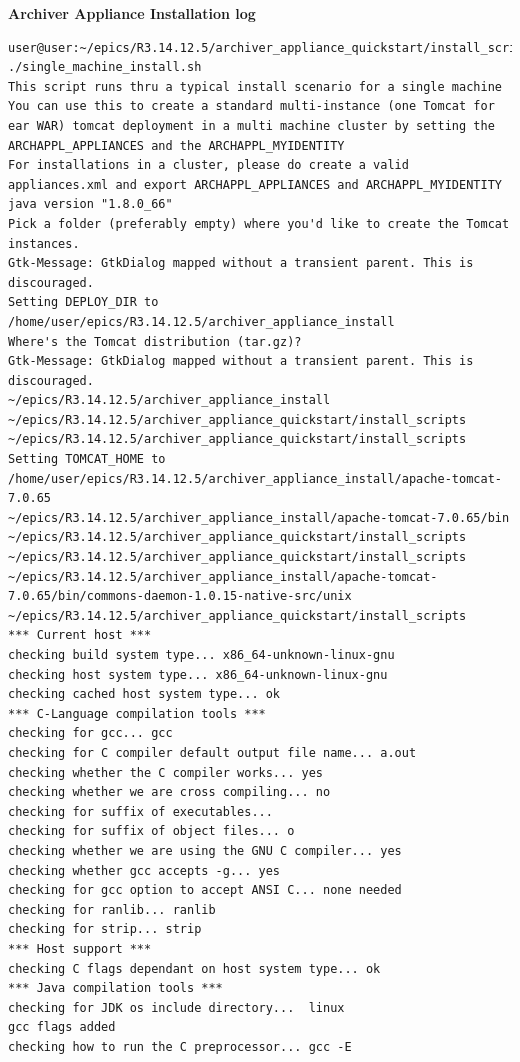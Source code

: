\documentclass[11pt
  , a4paper
  , article
  , oneside
]{memoir}
\begin{document}
\begin{center}
	\LARGE\textbf{Archiver Appliance Installation log}
\end{center}
\begin{lstlisting}[style=termstyle]
user@user:~/epics/R3.14.12.5/archiver_appliance_quickstart/install_scripts$ ./single_machine_install.sh 
This script runs thru a typical install scenario for a single machine
You can use this to create a standard multi-instance (one Tomcat for ear WAR) tomcat deployment in a multi machine cluster by setting the ARCHAPPL_APPLIANCES and the ARCHAPPL_MYIDENTITY
For installations in a cluster, please do create a valid appliances.xml and export ARCHAPPL_APPLIANCES and ARCHAPPL_MYIDENTITY
java version "1.8.0_66"
Pick a folder (preferably empty) where you'd like to create the Tomcat instances.
Gtk-Message: GtkDialog mapped without a transient parent. This is discouraged.
Setting DEPLOY_DIR to /home/user/epics/R3.14.12.5/archiver_appliance_install
Where's the Tomcat distribution (tar.gz)?
Gtk-Message: GtkDialog mapped without a transient parent. This is discouraged.
~/epics/R3.14.12.5/archiver_appliance_install ~/epics/R3.14.12.5/archiver_appliance_quickstart/install_scripts
~/epics/R3.14.12.5/archiver_appliance_quickstart/install_scripts
Setting TOMCAT_HOME to /home/user/epics/R3.14.12.5/archiver_appliance_install/apache-tomcat-7.0.65
~/epics/R3.14.12.5/archiver_appliance_install/apache-tomcat-7.0.65/bin ~/epics/R3.14.12.5/archiver_appliance_quickstart/install_scripts
~/epics/R3.14.12.5/archiver_appliance_quickstart/install_scripts
~/epics/R3.14.12.5/archiver_appliance_install/apache-tomcat-7.0.65/bin/commons-daemon-1.0.15-native-src/unix ~/epics/R3.14.12.5/archiver_appliance_quickstart/install_scripts
*** Current host ***
checking build system type... x86_64-unknown-linux-gnu
checking host system type... x86_64-unknown-linux-gnu
checking cached host system type... ok
*** C-Language compilation tools ***
checking for gcc... gcc
checking for C compiler default output file name... a.out
checking whether the C compiler works... yes
checking whether we are cross compiling... no
checking for suffix of executables... 
checking for suffix of object files... o
checking whether we are using the GNU C compiler... yes
checking whether gcc accepts -g... yes
checking for gcc option to accept ANSI C... none needed
checking for ranlib... ranlib
checking for strip... strip
*** Host support ***
checking C flags dependant on host system type... ok
*** Java compilation tools ***
checking for JDK os include directory...  linux
gcc flags added
checking how to run the C preprocessor... gcc -E

\end{lstlisting}
\end{document}
